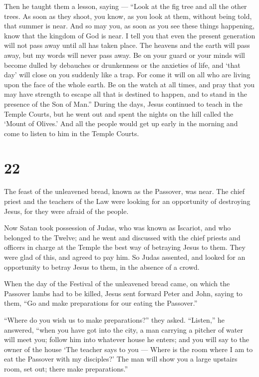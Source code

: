  Then he taught them a lesson, saying --- ``Look at the fig
tree and all the other trees.  As soon as they shoot, you
know, as you look at them, without being told, that summer is near.
 And so may you, as soon as you see these things happening,
know that the kingdom of God is near.  I tell you that even
the present generation will not pass away until all has taken place.
 The heavens and the earth will pass away, but my words
will never pass away.  Be on your guard or your minds will
become dulled by debauches or drunkenness or the anxieties of life, and
`that day' will close on you suddenly like a trap.  For
come it will on all who are living upon the face of the whole earth.
 Be on the watch at all times, and pray that you may have
strength to escape all that is destined to happen, and to stand in the
presence of the Son of Man.''  During the days, Jesus
continued to teach in the Temple Courts, but he went out and spent the
nights on the hill called the `Mount of Olives.'  And all
the people would get up early in the morning and come to listen to him
in the Temple Courts.

\hypertarget{section-20}{%
\section{22}\label{section-20}}

 The feast of the unleavened bread, known as the Passover,
was near.  The chief priest and the teachers of the Law were
looking for an opportunity of destroying Jesus, for they were afraid of
the people.

 Now Satan took possession of Judas, who was known as
Iscariot, and who belonged to the Twelve;  and he went and
discussed with the chief priests and officers in charge at the Temple
the best way of betraying Jesus to them.  They were glad of
this, and agreed to pay him.  So Judas assented, and looked
for an opportunity to betray Jesus to them, in the absence of a crowd.

 When the day of the Festival of the unleavened bread came,
on which the Passover lambs had to be killed,  Jesus sent
forward Peter and John, saying to them, ``Go and make preparations for
our eating the Passover.''

 ``Where do you wish us to make preparations?'' they asked.
 ``Listen,'' he answered, ``when you have got into the
city, a man carrying a pitcher of water will meet you; follow him into
whatever house he enters;  and you will say to the owner of
the house `The teacher says to you --- Where is the room where I am to
eat the Passover with my disciples?'  The man will show you
a large upstairs room, set out; there make preparations.''

